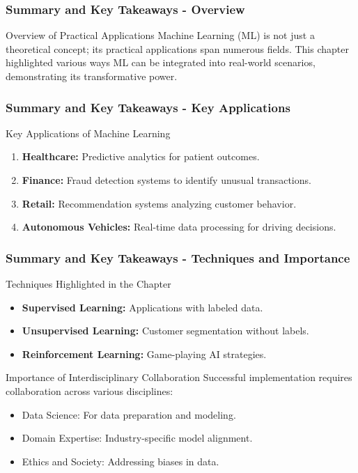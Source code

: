 \documentclass[aspectratio=169]{beamer}
\begin{document}
\begin{frame}[fragile]
    \frametitle{Summary and Key Takeaways - Overview}
    \begin{block}{Overview of Practical Applications}
        Machine Learning (ML) is not just a theoretical concept; its practical applications span numerous fields. This chapter highlighted various ways ML can be integrated into real-world scenarios, demonstrating its transformative power.
    \end{block}
\end{frame}

\begin{frame}[fragile]
    \frametitle{Summary and Key Takeaways - Key Applications}
    \begin{block}{Key Applications of Machine Learning}
        \begin{enumerate}
            \item \textbf{Healthcare:} Predictive analytics for patient outcomes.
            \item \textbf{Finance:} Fraud detection systems to identify unusual transactions.
            \item \textbf{Retail:} Recommendation systems analyzing customer behavior.
            \item \textbf{Autonomous Vehicles:} Real-time data processing for driving decisions.
        \end{enumerate}
    \end{block}
\end{frame}

\begin{frame}[fragile]
    \frametitle{Summary and Key Takeaways - Techniques and Importance}
    \begin{block}{Techniques Highlighted in the Chapter}
        \begin{itemize}
            \item \textbf{Supervised Learning:} Applications with labeled data.
            \item \textbf{Unsupervised Learning:} Customer segmentation without labels.
            \item \textbf{Reinforcement Learning:} Game-playing AI strategies.
        \end{itemize}
    \end{block}
    
    \begin{block}{Importance of Interdisciplinary Collaboration}
        Successful implementation requires collaboration across various disciplines:
        \begin{itemize}
            \item Data Science: For data preparation and modeling.
            \item Domain Expertise: Industry-specific model alignment.
            \item Ethics and Society: Addressing biases in data.
        \end{itemize}
    \end{block}
\end{frame}
\end{document}

